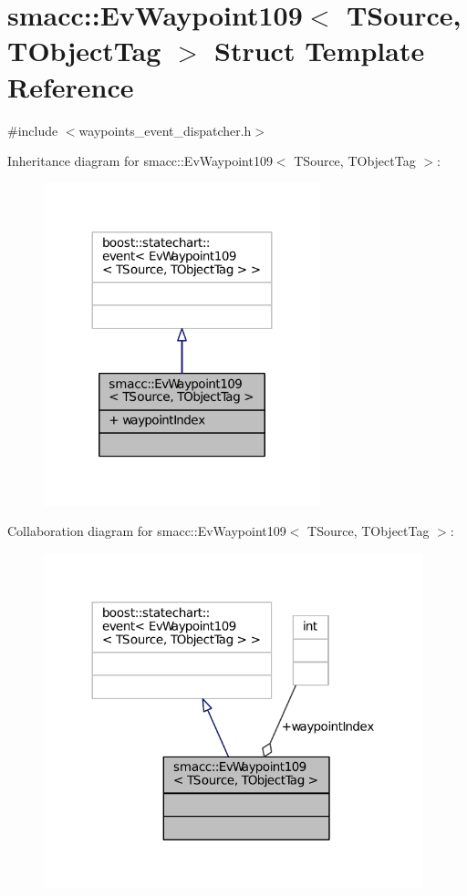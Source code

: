 \hypertarget{structsmacc_1_1EvWaypoint109}{}\section{smacc\+:\+:Ev\+Waypoint109$<$ T\+Source, T\+Object\+Tag $>$ Struct Template Reference}
\label{structsmacc_1_1EvWaypoint109}


{\ttfamily \#include $<$waypoints\+\_\+event\+\_\+dispatcher.\+h$>$}



Inheritance diagram for smacc\+:\+:Ev\+Waypoint109$<$ T\+Source, T\+Object\+Tag $>$\+:
\nopagebreak
\begin{figure}[H]
\begin{center}
\leavevmode
\includegraphics[width=227pt]{structsmacc_1_1EvWaypoint109__inherit__graph}
\end{center}
\end{figure}


Collaboration diagram for smacc\+:\+:Ev\+Waypoint109$<$ T\+Source, T\+Object\+Tag $>$\+:
\nopagebreak
\begin{figure}[H]
\begin{center}
\leavevmode
\includegraphics[width=312pt]{structsmacc_1_1EvWaypoint109__coll__graph}
\end{center}
\end{figure}
